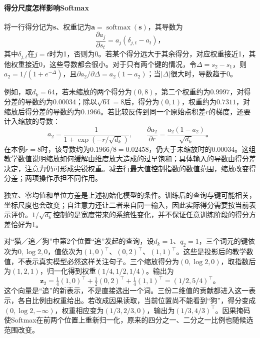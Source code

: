 \paragraph{得分尺度怎样影响Softmax}
将一行得分记为$\bm s$、权重记为$\bm a=\operatorname{softmax}(\bm s)$，其导数为
\begin{equation}
  \frac{\partial a_j}{\partial s_t}
      =a_j(\delta_{j,t}-a_t)\text{，}
  \label{eq:transformer-softmax-scale-gradient}
\end{equation}
其中$\delta_{j,t}$在$j=t$时为1，否则为0。若某个得分远大于其余得分，对应权重接近1，其他权重接近0，这些导数都会很小。对于只有两个键的情况，令$\Delta=s_2-s_1$，则$a_2=1/(1+e^{-\Delta})$，且$\partial a_2/\partial\Delta=a_2(1-a_2)$；当$|\Delta|$很大时，导数趋于0。

例如，取$d_k=64$，若未缩放的两个得分为$(0,8)$，第二个权重约为$0.9997$，对得分差的导数约为$0.00034$；除以$\sqrt{64}=8$后，得分为$(0,1)$，权重约为$0.7311$，对缩放后得分差的导数约为$0.1966$。若比较反传到同一个原始点积差$r$的梯度，还要计入缩放的导数：
\[
  a_2=\frac{1}{1+\exp(-r/\sqrt{d_k})},\qquad
  \frac{\partial a_2}{\partial r}
    =\frac{a_2(1-a_2)}{\sqrt{d_k}}\text{。}
\]
在本例$r=8$时，该导数约为$0.1966/8=0.02458$，仍大于未缩放时的$0.00034$。这组教学数值说明缩放如何缓解由维度放大造成的过早饱和；具体输入的导数由得分差决定，注意力仍可形成尖锐权重。减去行最大值控制指数的数值范围，缩放改变得分差；两项操作承担不同作用。

独立、零均值和单位方差是上述初始化模型的条件。训练后的查询与键可能相关，坐标尺度也会改变；自注意力还让二者来自同一输入，因此实际得分需要按当前表示评价。$1/\sqrt{d_k}$控制的是宽度带来的系统性变化，并不保证任意训练阶段的得分方差恰好为1。

\begin{example}[同一查询在不同可见范围内的读取]
  \label{ex:transformer-attention-numerical}
  对“猫／追／狗”中第2个位置“追”发起的查询，设$d_k=1$、$q_2=1$，三个词元的键依次为$0,\log2,0$，值依次为$(1,0)^{\top}$、$(0,2)^{\top}$、$(1,1)^{\top}$。这些是投影后的教学数值，不表示真实模型必然这样关注句子。三个缩放得分为$(0,\log2,0)$，取指数后为$(1,2,1)$，归一化得到权重$(1/4,1/2,1/4)$。输出为
  \[
    \bm z_2=\tfrac14(1,0)^{\top}+\tfrac12(0,2)^{\top}
                    +\tfrac14(1,1)^{\top}
             =(1/2,5/4)^{\top}\text{。}
  \]
  这个向量是“追”的新表示，不是直接选出一个词。三份二维值的贡献都进入这一表示，各自比例由权重给出。若改成因果读取，当前位置尚不能看到“狗”，得分变成$(0,\log2,-\infty)$，权重相应变为$(1/3,2/3,0)$，输出为$(1/3,4/3)^{\top}$。因果掩码使Softmax在前两个位置上重新归一化，原来的四分之一、二分之一比例也随候选范围改变。
\end{example}

